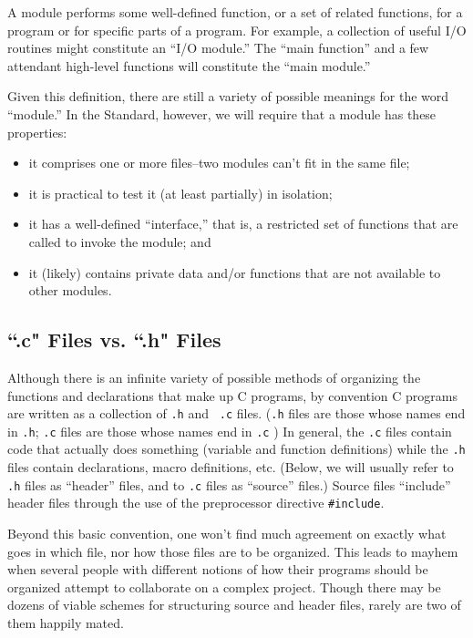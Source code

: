 A module performs some well-defined function, or a set of related
functions, for a program or for specific parts of a program.  For
example, a collection of useful I/O routines might constitute an ``I/O
module.''  The ``main function'' and a few attendant high-level
functions will constitute the ``main module.''


Given this definition, there are still a variety of possible meanings
for the word ``module.''  In the Standard, however, we will require
that a module has these properties:
\begin{itemize}
\item it comprises one or more files--two modules can't fit in the same file;
\item it is practical to test it (at least partially) in isolation;
\item it has a well-defined ``interface,'' that is,
     a restricted set of functions that are called to invoke the module; and
\item it (likely) contains private data and/or functions that are not
available to other modules.
\end{itemize}

\subsection{``.c" Files vs. ``.h" Files}

Although there is an infinite variety of possible methods of
organizing the functions and declarations that make up C programs, by
convention C programs are written as a collection of {\tt .h} and {\tt
.c} files.  ({\tt .h} files are those whose names end in {\tt .h};
{\tt .c} files are those whose names end in {\tt .c} ) In general, the
{\tt .c} files contain code that actually does something (variable and
function definitions) while the {\tt .h} files contain declarations,
macro definitions, etc.  (Below, we will usually refer to {\tt .h}
files as ``header'' files, and to {\tt .c} files as ``source'' files.)
Source files ``include'' header files through the use of the
preprocessor directive {\tt \#include}.

Beyond this basic convention, one won't find much agreement on exactly
what goes in which file, nor how those files are to be organized.
This leads to mayhem when several people with different notions of how
their programs should be organized attempt to collaborate on a complex
project.  Though there may be dozens of viable schemes for structuring
source and header files, rarely are two of them happily mated.

